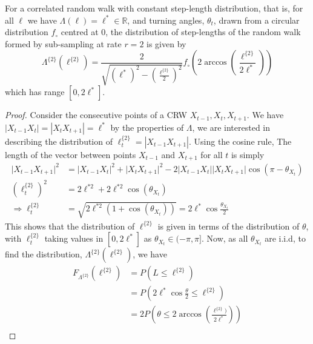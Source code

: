 \documentclass[10pt,a4paper]{amsart}
\begin{document}
\begin{corollary}
    For a correlated random walk with constant step-length distribution, that is, for all $\ell$ we have $\Lambda(\ell)=\ell^*\in \mathbb{R}$, and turning angles, $\theta_t$, drawn from a circular distribution $f_\circ$ centred at 0, the distribution of step-lengths of the random walk formed by sub-sampling at rate $r=2$ is given by \begin{equation}
        \Lambda^{\{2\}}(\ell^{\{2\}})=\frac{2}{\sqrt{(\ell^*)^2-\left(\frac{\ell^{\{2\}}}{2}\right)^2}}f_\circ\left(2\arccos{\left(\frac{\ell^{\{2\}}}{2\ell^*}\right)}\right)
    \end{equation} which has range $[0,2\ell^*]$.  
\end{corollary}

\begin{proof}
Consider the consecutive points of a CRW $X_{t-1},X_t,X_{t+1}$.  We have $|X_{t-1}X_t|=|X_tX_{t+1}|=\ell^*$ by the properties of $\Lambda$, we are interested in describing the distribution of $\ell_t^{\{2\}}=|X_{t-1}X_{t+1}|$.  Using the cosine rule, The length of the vector between points $X_{t-1}$ and $X_{t+1}$ for all $t$ is simply
   \begin{align}\nonumber
     \lvert X_{t-1}X_{t+1}\rvert^2&=\lvert X_{t-1}X_t\rvert^2+\lvert X_{t}X_{t+1}\rvert^2-2\lvert X_{t-1}X_t\rvert\lvert X_{t}X_{t+1}\rvert\cos{\left(\pi-\theta_{X_t}\right)}\\\nonumber
       \left(\ell_t^{\{2\}}\right)^2&=2\ell^{*2}+2\ell^{*2}\cos{\left(\theta_{X_t}\right)}\\
       \Rightarrow \ell_t^{\{2\}}&=\sqrt{2\ell^{*2}(1+\cos{\left(\theta_{X_t}\right)})}=2\ell^*\cos{\frac{\theta_{X_t}}{2}}
       \label{eqn: 12}
   \end{align}
This shows that the distribution of $\ell^{\{2\}}$ is given in terms of the distribution of $\theta$, with $\ell_t^{\{2\}}$ taking values in $[0,2\ell^*]$ as $\theta_{X_t}\in(-\pi,\pi]$.  Now, as all $\theta_{X_t}$ are i.i.d, to find the distribution, $\Lambda^{\{2\}}(\ell^{\{2\}})$, we have
   \begin{align}\nonumber
       F_{\Lambda^{\{2\}}}(\ell^{\{2\}})&=P(L\leq \ell^{\{2\}})\\\nonumber
       &=P\left(2\ell^*\cos{\frac{\theta}{2}}\leq \ell^{\{2\}}\right)\\\nonumber
       &=2P\left(\theta\leq 2\arccos{\left(\frac{\ell^{\{2\}})}{2\ell^*}\right)}\right)\\

\end{align}
\end{proof}
\end{document}
